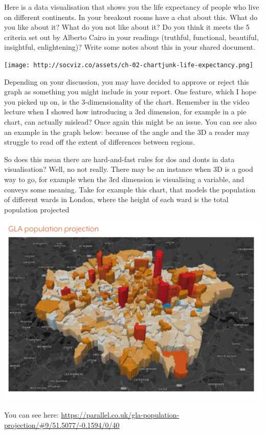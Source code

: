 \documentclass[
]{book}
\begin{document}
Here is a data visualisation that shows you the life expectancy of people who live on different continents. In your breakout rooms have a chat about this. What do you like about it? What do you not like about it? Do you think it meets the 5 criteria set out by Alberto Cairo in your readings (truthful, functional, beautiful, insightful, enlightening)? Write some notes about this in your shared document.

\texttt{[image: http://socviz.co/assets/ch-02-chartjunk-life-expectancy.png]}

Depending on your discussion, you may have decided to approve or reject this graph as something you might include in your report. One feature, which I hope you picked up on, is the 3-dimensionality of the chart. Remember in the video lecture when I showed how introducing a 3rd dimension, for example in a pie chart, can actually mislead? Once again this might be an issue. You can see also an example in the graph below: because of the angle and the 3D a reader may struggle to read off the extent of differences between regions.

So does this mean there are hard-and-fast rules for dos and donts in data visualisation? Well, no not really. There may be an instance when 3D is a good way to go, for example when the 3rd dimension is visualising a variable, and conveys some meaning. Take for example this chart, that models the population of different wards in London, where the height of each ward is the total population projected

\includegraphics{imgs/gla_pop.png}

You can see here: \url{https://parallel.co.uk/gla-population-projection/\#9/51.5077/-0.1594/0/40}
\end{document}
